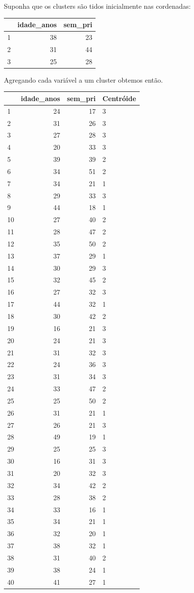 \documentclass[
  letterpaper,
  DIV=11,
  numbers=noendperiod]{scrreprt}
\begin{document}
Suponha que os clusters são tidos inicialmente nas cordenadas:

\begin{longtable}[]{@{}lrr@{}}
\toprule()
& idade\_anos & sem\_pri \\
\midrule()
\endhead
1 & 38 & 23 \\
2 & 31 & 44 \\
3 & 25 & 28 \\
\bottomrule()
\end{longtable}

Agregando cada variável a um cluster obtemos então.

\begin{longtable}[]{@{}lrrl@{}}
\toprule()
& idade\_anos & sem\_pri & Centróide \\
\midrule()
\endhead
1 & 24 & 17 & 3 \\
2 & 31 & 26 & 3 \\
3 & 27 & 28 & 3 \\
4 & 20 & 33 & 3 \\
5 & 39 & 39 & 2 \\
6 & 34 & 51 & 2 \\
7 & 34 & 21 & 1 \\
8 & 29 & 33 & 3 \\
9 & 44 & 18 & 1 \\
10 & 27 & 40 & 2 \\
11 & 28 & 47 & 2 \\
12 & 35 & 50 & 2 \\
13 & 37 & 29 & 1 \\
14 & 30 & 29 & 3 \\
15 & 32 & 45 & 2 \\
16 & 27 & 32 & 3 \\
17 & 44 & 32 & 1 \\
18 & 30 & 42 & 2 \\
19 & 16 & 21 & 3 \\
20 & 24 & 21 & 3 \\
21 & 31 & 32 & 3 \\
22 & 24 & 36 & 3 \\
23 & 31 & 34 & 3 \\
24 & 33 & 47 & 2 \\
25 & 25 & 50 & 2 \\
26 & 31 & 21 & 1 \\
27 & 26 & 21 & 3 \\
28 & 49 & 19 & 1 \\
29 & 25 & 25 & 3 \\
30 & 16 & 31 & 3 \\
31 & 20 & 32 & 3 \\
32 & 34 & 42 & 2 \\
33 & 28 & 38 & 2 \\
34 & 33 & 16 & 1 \\
35 & 34 & 21 & 1 \\
36 & 32 & 20 & 1 \\
37 & 38 & 32 & 1 \\
38 & 31 & 40 & 2 \\
39 & 38 & 24 & 1 \\
40 & 41 & 27 & 1 \\
\bottomrule()
\end{longtable}
\end{document}
